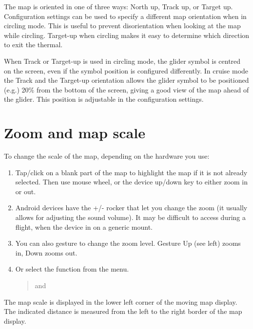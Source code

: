 The map is oriented in one of three ways: North up,
Track up, or Target up.  Configuration settings  can be used
to specify a different map orientation when in circling mode. This is useful to prevent
disorientation when looking at the map while circling.  Target-up when
circling makes it easy to determine which direction to exit the
thermal.

When Track or Target-up is used in circling mode, the glider symbol is
centred on the screen, even if the symbol position is configured differently.
In cruise mode the Track and the Target-up orientation allows the glider
symbol to be positioned (e.g.) 20\% from the bottom of the screen, giving a good view of the
map ahead of the glider.  This position is adjustable in the configuration
 settings.

\section{Zoom and map scale}\label{sec:zooming}

To change the scale of the map, depending on the hardware you use:
\begin{enumerate}
\item Tap/click on a blank part of the map to highlight the map if it is not
already selected.
Then use mouse wheel, or the device up/down key to either zoom
in or out.
\item Android devices have the +/- rocker that let you change the zoom (it usually allows for adjusting the sound volume). It may be difficult to access during a flight, when the device in on a generic mount.
\item You can also gesture to change the zoom level. Gesture 
Up (see left) zooms in, Down zooms out.
\item Or select the function from the menu.
\begin{quote}
\blink{} and 
\end{quote}
\end{enumerate}

The map scale is displayed in the lower left corner of the moving map
display. The indicated distance is measured from the left to the right border
of the map display.

